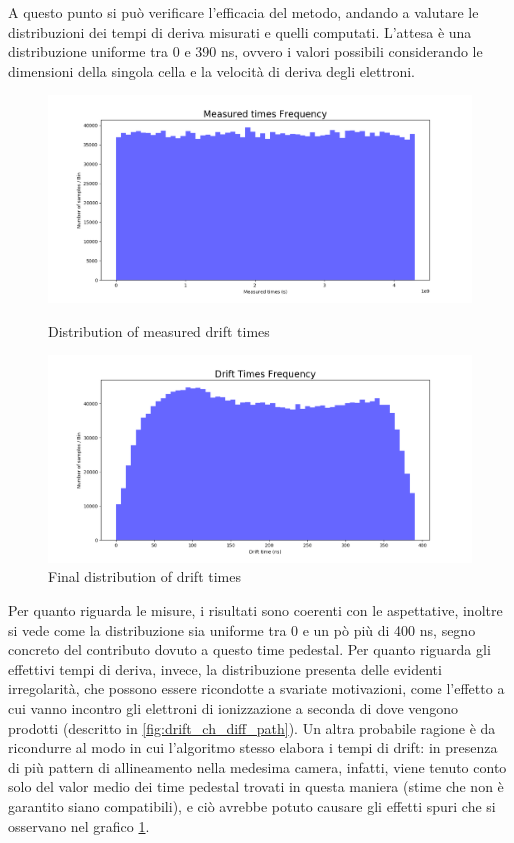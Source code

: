 \documentclass[a4paper,11pt]{book}
\begin{document}
A questo punto si può verificare l'efficacia del metodo, andando a valutare le distribuzioni dei tempi di deriva misurati e quelli computati. L'attesa è una distribuzione uniforme tra 0 e 390 ns, ovvero i valori possibili considerando le dimensioni della singola cella e la velocità di deriva degli elettroni.

\begin{figure}[hbtp]
\begin{minipage}[c]{0.5\textwidth}
\centering
\includegraphics[scale=0.25]{pictures/Measured_times_Frequency.pdf}
\caption{Distribution of measured drift times}
\label{fig:TIME_NS}
\end{minipage}  
\begin{minipage}[c]{0.5\textwidth}
\centering
\includegraphics[scale=0.25]{pictures/Drift_Times_Frequency.pdf}
\caption{Final distribution of drift times}
\label{fig:DRIFT_TIMES}
\end{minipage}
\end{figure}

Per quanto riguarda le misure, i risultati sono coerenti con le aspettative, inoltre si vede come la distribuzione sia uniforme tra 0 e un pò più di 400 ns, segno concreto del contributo dovuto a questo time pedestal.  Per quanto riguarda gli effettivi tempi di deriva, invece, la distribuzione presenta delle evidenti irregolarità, che possono essere ricondotte a svariate motivazioni, come l'effetto a cui vanno incontro gli elettroni di ionizzazione a seconda di dove vengono prodotti (descritto in \ref{fig:drift_ch_diff_path}). Un altra probabile ragione è da ricondurre al modo in cui l'algoritmo stesso elabora i tempi di drift: in presenza di più pattern di allineamento nella medesima camera, infatti, viene tenuto conto solo del valor medio dei time pedestal trovati in questa maniera (stime che non è garantito siano compatibili), e ciò avrebbe potuto causare gli effetti spuri che si osservano nel grafico \ref{fig:DRIFT_TIMES}.\\
\end{document}
